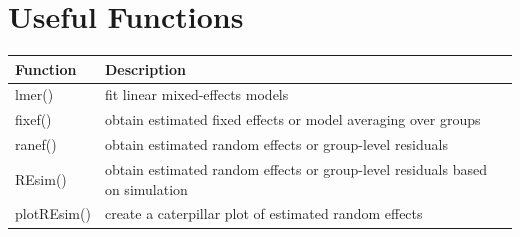\documentclass[]{book}
\begin{document}
\section{Useful Functions}\label{useful-functions-1}

\begin{longtable}[]{@{}ll@{}}
\toprule
\begin{minipage}[b]{0.14\columnwidth}\raggedright\strut
Function\strut
\end{minipage} & \begin{minipage}[b]{0.60\columnwidth}\raggedright\strut
Description\strut
\end{minipage}\tabularnewline
\midrule
\endhead
\begin{minipage}[t]{0.14\columnwidth}\raggedright\strut
lmer()\strut
\end{minipage} & \begin{minipage}[t]{0.60\columnwidth}\raggedright\strut
fit linear mixed-effects models\strut
\end{minipage}\tabularnewline
\begin{minipage}[t]{0.14\columnwidth}\raggedright\strut
fixef()\strut
\end{minipage} & \begin{minipage}[t]{0.60\columnwidth}\raggedright\strut
obtain estimated fixed effects or model averaging over groups\strut
\end{minipage}\tabularnewline
\begin{minipage}[t]{0.14\columnwidth}\raggedright\strut
ranef()\strut
\end{minipage} & \begin{minipage}[t]{0.60\columnwidth}\raggedright\strut
obtain estimated random effects or group-level residuals\strut
\end{minipage}\tabularnewline
\begin{minipage}[t]{0.14\columnwidth}\raggedright\strut
REsim()\strut
\end{minipage} & \begin{minipage}[t]{0.60\columnwidth}\raggedright\strut
obtain estimated random effects or group-level residuals based on
simulation\strut
\end{minipage}\tabularnewline
\begin{minipage}[t]{0.14\columnwidth}\raggedright\strut
plotREsim()\strut
\end{minipage} & \begin{minipage}[t]{0.60\columnwidth}\raggedright\strut
create a caterpillar plot of estimated random effects\strut

\end{minipage}
\end{longtable}
\end{document}
